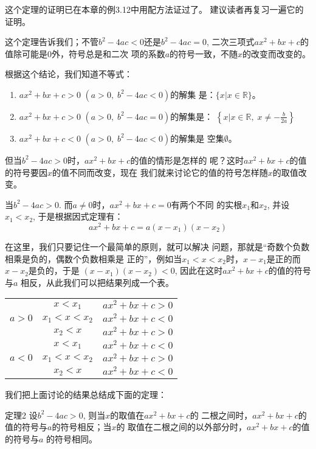 这个定理的证明已在本章的例3.12中用配方法证过了。
建议读者再复习一遍它的证明。

这个定理告诉我们；不管$b^2-4ac<0$还是$b^2-4ac=0$,
二次三项式$ax^2+bx+c$的值除可能是0外，符号总是和二次
项的系数$a$的符号一致，不随$x$的改变而改变的。

根据这个结论，我们知道不等式：
\begin{enumerate}
    \item $ax^2+bx+c>0$ $(a>0,\; b^2-4ac<0)$的解集
    是：$\{x|x\in\mathbb{R}\}$。
    \item $ax^2+bx+c>0$ $(a>0,\;b^2-4ac=0)$的解集是：
    $\left\{x\Big|x\in\mathbb{R},\; x\ne -\frac{b}{2a}\right\}$
    \item $ax^2+bx+c<0$ $(a>0,\; b^2-4ac<0)$的解集是
    空集$\emptyset$。
\end{enumerate}

但当$b^2-4ac>0$时，$ax^2+bx+c$的值的情形是怎样的
呢？这时$ax^2+bx+c$的值的符号要因$x$的值不同而改变，现在
我们就来讨论它的值的符号怎样随$x$的取值改变。

当$b^2-4ac>0$. 而$a\ne 0$时，$ax^2+bx+c=0$有两个不同
的实根$x_1$和$x_2$, 并设$x_1<x_2$, 于是根据因式定理有：
\[ax^2+bx+c=a(x-x_1)(x-x_2)\]

在这里，我们只要记住一个最简单的原则，就可以解决
问题，那就是“奇数个负数相乘是负的，偶数个负数相乘是
正的”，例如当$x_1<x<x_2$时，$x-x_1$是正的而$x-x_2$是负的，于是
$(x-x_1)(x-x_2)<0$, 因此在这时$ax^2+bx+c$的值的符号与$a$
相反，从此我们可以把结果列成一个表。
\begin{center}
\begin{tabular}{c|c|c}
\hline
      & $x<x_1$ & $ax^2+bx+c>0$\\
 $a>0$   &  $x_1<x<x_2$ & $ax^2+bx+c<0$\\
    &  $x_2<x$ & $ax^2+bx+c>0$\\
\hline
  & $x<x_1$ & $ax^2+bx+c<0$\\
$a<0$&  $x_1<x<x_2$ & $ax^2+bx+c>0$\\
&  $x_2<x$ & $ax^2+bx+c<0$\\
\hline
\end{tabular}
\end{center}

我们把上面讨论的结果总结成下面的定理：
\begin{blk}{定理2}
    设$b^2-4ac>0$, 则当$x$的取值在$ax^2+bx+c$的
    二根之间时，$ax^2+bx+c$的值的符号与$a$的符号相反；当$x$的
    取值在二根之间的以外部分时，$ax^2+bx+c$的值的符号与$a$
    的符号相同。 
\end{blk}

